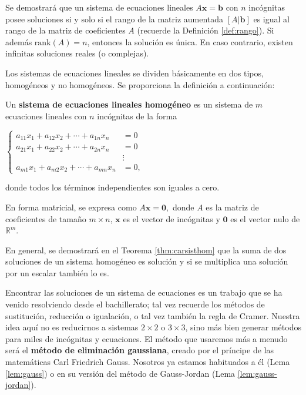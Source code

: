 Se demostrará que un sistema de ecuaciones lineales $A\mathbf{x} = \mathbf{b}$ con $n$ incógnitas posee soluciones si y solo si el rango de la matriz aumentada $[A|\mathbf{b}]$ es igual al rango de la matriz de coeficientes $A$ (recuerde la Definición \ref{def:rango}). Si además $\text{rank}(A) = n$, entonces la solución es única. En caso contrario, existen infinitas soluciones reales (o complejas).

Los sistemas de ecuaciones lineales se dividen básicamente en dos tipos, homogéneos y no homogéneos. Se proporciona la definición a continuación:

\begin{definition}
Un \textbf{sistema de ecuaciones lineales homogéneo} es un sistema de $m$ ecuaciones lineales con $n$ incógnitas de la forma

$\begin{cases}
a_{11}x_1 + a_{12}x_2 + \cdots + a_{1n}x_n &= 0 \nonumber\\
a_{21}x_1 + a_{22}x_2 + \cdots + a_{2n}x_n &= 0 \nonumber\\
&\vdots \\
a_{m1}x_1 + a_{m2}x_2 + \cdots + a_{mn}x_n &= 0,
\end{cases}$

donde todos los términos independientes son iguales a cero.

En forma matricial, se expresa como $A\mathbf{x} = \mathbf{0},$
donde $A$ es la matriz de coeficientes de tamaño $m \times n$, $\mathbf{x}$ es el vector de incógnitas y $\mathbf{0}$ es el vector nulo de $\mathbb{R}^m$.
\end{definition}

En general, se demostrará en el Teorema \ref{thm:carsisthom} que la suma de dos soluciones de un sistema homogéneo es solución y si se multiplica una solución por un escalar también lo es.

Encontrar las soluciones de un sistema de ecuaciones es un trabajo que se ha venido resolviendo desde el bachillerato; tal vez recuerde los métodos de sustitución, reducción o igualación, o tal vez también la regla de Cramer. Nuestra idea aquí no es reducirnos a sistemas $2\times 2$ o $3\times 3$, sino más bien generar métodos para miles de incógnitas y ecuaciones. El método que usaremos más a menudo será el \textbf{método de eliminación gaussiana}, creado por el príncipe de las matemáticas Carl Friedrich Gauss. Nosotros ya estamos habituados a él (Lema \ref{lem:gauss}) o en su versión del método de Gauss-Jordan (Lema \ref{lem:gauss-jordan}).


